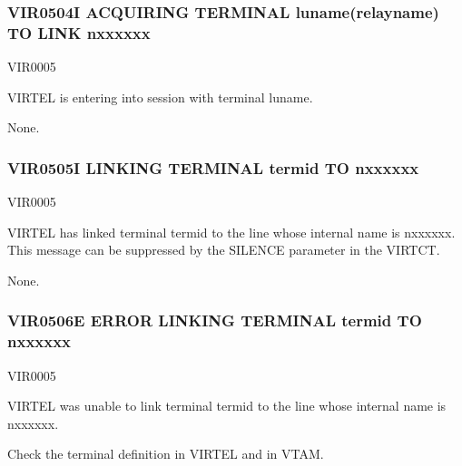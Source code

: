 \documentclass[letterpaper,10pt,english]{sphinxmanual}
\begin{document}
\subsubsection{VIR0504I ACQUIRING TERMINAL luname(relayname) TO LINK n\sphinxhyphen{}xxxxxx}
\label{\detokenize{messages:vir0504i-acquiring-terminal-luname-relayname-to-link-n-xxxxxx}}\begin{description}
\sphinxAtStartPar
VIR0005

\sphinxAtStartPar
VIRTEL is entering into session with terminal luname.

\sphinxAtStartPar
None.

\end{description}


\subsubsection{VIR0505I  LINKING TERMINAL termid TO n\sphinxhyphen{}xxxxxx}
\label{\detokenize{messages:vir0505i-linking-terminal-termid-to-n-xxxxxx}}\begin{description}
\sphinxAtStartPar
VIR0005

\sphinxAtStartPar
VIRTEL has linked terminal termid to the line whose internal name is n\sphinxhyphen{}xxxxxx. This message can be suppressed by the SILENCE parameter in the VIRTCT.

\sphinxAtStartPar
None.

\end{description}


\subsubsection{VIR0506E ERROR LINKING TERMINAL termid TO n\sphinxhyphen{}xxxxxx}
\label{\detokenize{messages:vir0506e-error-linking-terminal-termid-to-n-xxxxxx}}\begin{description}
\sphinxAtStartPar
VIR0005

\sphinxAtStartPar
VIRTEL was unable to link terminal termid to the line whose internal name is n\sphinxhyphen{}xxxxxx.

\sphinxAtStartPar
Check the terminal definition in VIRTEL and in VTAM.

\end{description}
\end{document}
